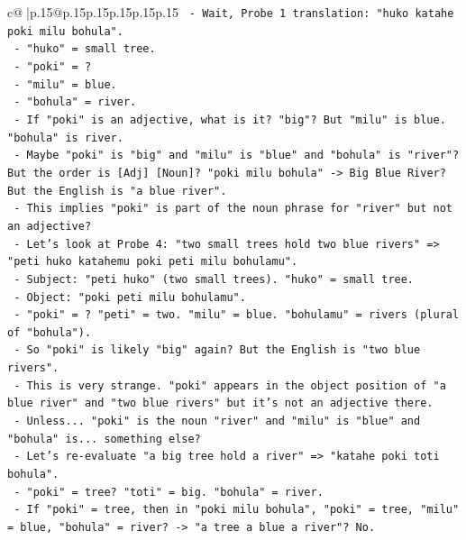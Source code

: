 \documentclass{article}
\begin{document}
{\begin{supertabular}{c@{$\;$}|p{.15\linewidth}@{}p{.15\linewidth}p{.15\linewidth}p{.15\linewidth}p{.15\linewidth}p{.15\linewidth}}
{{{\texttt{                {-} Wait, Probe 1 translation: "huko katahe poki milu bohula".} \\
\texttt{                  {-} "huko" = small tree.} \\
\texttt{                  {-} "poki" = ?} \\
\texttt{                  {-} "milu" = blue.} \\
\texttt{                  {-} "bohula" = river.} \\
\texttt{                  {-} If "poki" is an adjective, what is it? "big"? But "milu" is blue. "bohula" is river.} \\
\texttt{                  {-} Maybe "poki" is "big" and "milu" is "blue" and "bohula" is "river"? But the order is {[}Adj{]} {[}Noun{]}? "poki milu bohula" {-}> Big Blue River? But the English is "a blue river".} \\
\texttt{                  {-} This implies "poki" is part of the noun phrase for "river" but not an adjective?} \\
\texttt{                  {-} Let's look at Probe 4: "two small trees hold two blue rivers" => "peti huko katahemu poki peti milu bohulamu".} \\
\texttt{                    {-} Subject: "peti huko" (two small trees). "huko" = small tree.} \\
\texttt{                    {-} Object: "poki peti milu bohulamu".} \\
\texttt{                    {-} "poki" = ? "peti" = two. "milu" = blue. "bohulamu" = rivers (plural of "bohula").} \\
\texttt{                    {-} So "poki" is likely "big" again? But the English is "two blue rivers".} \\
\texttt{                    {-} This is very strange. "poki" appears in the object position of "a blue river" and "two blue rivers" but it's not an adjective there.} \\
\texttt{                    {-} Unless... "poki" is the noun "river" and "milu" is "blue" and "bohula" is... something else?} \\
\texttt{                    {-} Let's re{-}evaluate "a big tree hold a river" => "katahe poki toti bohula".} \\
\texttt{                      {-} "poki" = tree? "toti" = big. "bohula" = river.} \\
\texttt{                      {-} If "poki" = tree, then in "poki milu bohula", "poki" = tree, "milu" = blue, "bohula" = river? {-}> "a tree a blue a river"? No.} \\
}}}
\end{supertabular}}
\end{document}
